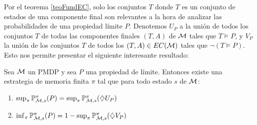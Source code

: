 Por el teorema \ref{teoFundEC}, solo los conjuntos $T$ donde $T$ es un conjunto
de estados de una componente final son relevantes a la hora de analizar las
probabilidades de una propiedad límite $P$. Denotemos $U_P$ a la unión de todos
los conjuntos $T$ de todas las componentes finales $(T,A)$ de $\mathcal{M}$ tales que $T
	\models P$, y $V_P$ la unión de los conjuntos $T$ de todos los $(T,A) \in
	EC(\mathcal{M})$ tales que $\neg (T \models P)$. Esto nos permite presentar el siguiente
interesante resultado:


\begin{theorem}
	\label{rabinAlcPMDP}
	Sea $\mathcal{M}$ un PMDP y sea $P$ una propiedad de límite. Entonces existe una estrategia de memoria finita $\pi$ tal que para todo estado $s$ de $\mathcal{M}$:

	\begin{enumerate}[label=(\alph*)]
		\item $\sup_{\pi} \mathbb{P}_{\mathcal{M}, s}^\pi (P) = \sup_{\pi} \mathbb{P}_{\mathcal{M}, s}^\pi (\diamondsuit U_P)$

		\item $\inf_{\pi} \mathbb{P}_{\mathcal{M}, s}^\pi (P) = 1 - \sup_{\pi} \mathbb{P}_{\mathcal{M}, s}^\pi (\diamondsuit V_P)$
	\end{enumerate}
\end{theorem}

